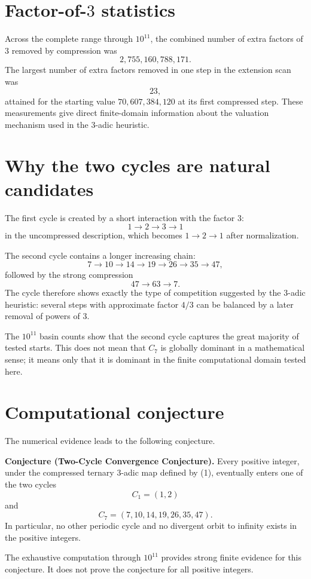 \documentclass[11pt]{article}
\begin{document}
\section{Factor-of-$3$ statistics}
Across the complete range through $10^{11}$, the combined number of extra factors of $3$ removed by compression was
\[
2,755,160,788,171.
\]
The largest number of extra factors removed in one step in the extension scan was
\[
23,
\]
attained for the starting value $70,607,384,120$ at its first compressed step. These measurements give direct finite-domain information about the valuation mechanism used in the $3$-adic heuristic.

\section{Why the two cycles are natural candidates}
The first cycle is created by a short interaction with the factor $3$:
\[
1\to2\to3\to1
\]
in the uncompressed description, which becomes $1\to2\to1$ after normalization.

The second cycle contains a longer increasing chain:
\[
7\to10\to14\to19\to26\to35\to47,
\]
followed by the strong compression
\[
47\to63\to7.
\]
The cycle therefore shows exactly the type of competition suggested by the $3$-adic heuristic: several steps with approximate factor $4/3$ can be balanced by a later removal of powers of $3$.

The $10^{11}$ basin counts show that the second cycle captures the great majority of tested starts. This does not mean that $C_7$ is globally dominant in a mathematical sense; it means only that it is dominant in the finite computational domain tested here.

\section{Computational conjecture}
The numerical evidence leads to the following conjecture.

\textbf{Conjecture (Two-Cycle Convergence Conjecture).} Every positive integer, under the compressed ternary $3$-adic map defined by (1), eventually enters one of the two cycles
\[
C_1=(1,2)
\]
and
\[
C_7=(7,10,14,19,26,35,47).
\]
In particular, no other periodic cycle and no divergent orbit to infinity exists in the positive integers.

The exhaustive computation through $10^{11}$ provides strong finite evidence for this conjecture. It does not prove the conjecture for all positive integers.
\end{document}
